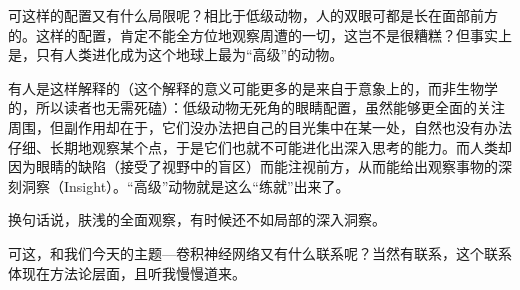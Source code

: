 可这样的配置又有什么局限呢？相比于低级动物，人的双眼可都是长在面部前方的。这样的配置，肯定不能全方位地观察周遭的一切，这岂不是很糟糕？但事实上是，只有人类进化成为这个地球上最为“高级”的动物。

有人是这样解释的（这个解释的意义可能更多的是来自于意象上的，而非生物学的，所以读者也无需死磕）：低级动物无死角的眼睛配置，虽然能够更全面的关注周围，但副作用却在于，它们没办法把自己的目光集中在某一处，自然也没有办法仔细、长期地观察某个点，于是它们也就不可能进化出深入思考的能力。而人类却因为眼睛的缺陷（接受了视野中的盲区）而能注视前方，从而能给出观察事物的深刻洞察（Insight）。“高级”动物就是这么“练就”出来了。

换句话说，肤浅的全面观察，有时候还不如局部的深入洞察。

可这，和我们今天的主题---卷积神经网络又有什么联系呢？当然有联系，这个联系体现在方法论层面，且听我慢慢道来。